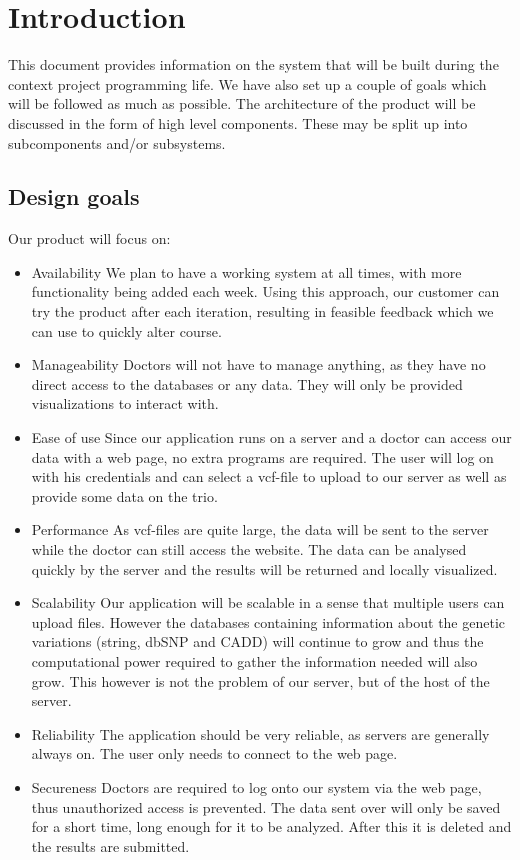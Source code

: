 \section{Introduction}
	This document provides information on the system that will be built during the context project programming life. We have also set up a couple of goals which will be followed as much as possible. The architecture of the product will be discussed in the form of high level components. These may be split up into subcomponents and/or subsystems.
	\subsection{Design goals}
	Our product will focus on:
	\begin{itemize}
		\item Availability
			\subitem We plan to have a working system at all times, with more functionality being added each week. Using this approach, our customer can try the product after each iteration, resulting in feasible feedback which we can use to quickly alter course.
		\item Manageability
			\subitem Doctors will not have to manage anything, as they have no direct access to the databases or any data. They will only be provided visualizations to interact with.
		\item Ease of use
			\subitem Since our application runs on a server and a doctor can access our data with a web page, no extra programs are required. The user will log on with his credentials and can select a vcf-file to upload to our server as well as provide some data on the trio.
		\item Performance
			\subitem As vcf-files are quite large, the data will be sent to the server while the doctor can still access the website. The data can be analysed quickly by the server and the results will be returned and locally visualized.
		\item Scalability
			\subitem Our application will be scalable in a sense that multiple users can upload files. However the databases containing information about the genetic variations (string, dbSNP and CADD) will continue to grow and thus the computational power required to gather the information needed will also grow. This however is not the problem of our server, but of the host of the server.
		\item Reliability
			\subitem The application should be very reliable, as servers are generally always on. The user only needs to connect to the web page.
		\item Secureness
			\subitem Doctors are required to log onto our system via the web page, thus unauthorized access is prevented. The data sent over will only be saved for a short time, long enough for it to be analyzed. After this it is deleted and the results are submitted.
	\end{itemize}
